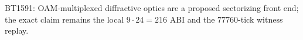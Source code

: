 \begin{center}\small
BT1591: OAM-multiplexed diffractive optics are a proposed sectorizing front end; the exact claim remains the local $9\cdot24=216$ ABI and the $77760$-tick witness replay.
\end{center}
